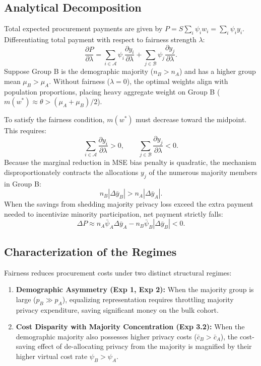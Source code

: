 \documentclass[11pt,a4paper]{article}
\begin{document}
\subsection{Analytical Decomposition}

Total expected procurement payments are given by $P = S \sum_i \psi_i w_i = \sum_i \psi_i y_i$. Differentiating total payment with respect to fairness strength $\lambda$:
\begin{equation}
    \frac{\partial P}{\partial \lambda} = \sum_{i \in \mathcal{A}} \psi_i \frac{\partial y_i}{\partial \lambda} + \sum_{j \in \mathcal{B}} \psi_j \frac{\partial y_j}{\partial \lambda}.
\end{equation}
Suppose Group B is the demographic majority ($n_B > n_A$) and has a higher group mean $\mu_B > \mu_A$. Without fairness ($\lambda = 0$), the optimal weights align with population proportions, placing heavy aggregate weight on Group B ($m(w^*) \approx \theta > (\mu_A+\mu_B)/2$).

To satisfy the fairness condition, $m(w^*)$ must decrease toward the midpoint. This requires:
\begin{equation}
    \sum_{i \in \mathcal{A}} \frac{\partial y_i}{\partial \lambda} > 0, \qquad \sum_{j \in \mathcal{B}} \frac{\partial y_j}{\partial \lambda} < 0.
\end{equation}
Because the marginal reduction in MSE bias penalty is quadratic, the mechanism disproportionately contracts the allocations $y_j$ of the numerous majority members in Group B:
\begin{equation}
    n_B \left| \Delta \bar{y}_B \right| > n_A \left| \Delta \bar{y}_A \right|.
\end{equation}
When the savings from shedding majority privacy loss exceed the extra payment needed to incentivize minority participation, net payment strictly falls:
\begin{equation}
    \Delta P \approx n_A \bar{\psi}_A \Delta \bar{y}_A - n_B \bar{\psi}_B |\Delta \bar{y}_B| < 0.
\end{equation}

\subsection{Characterization of the Regimes}

Fairness reduces procurement costs under two distinct structural regimes:
\begin{enumerate}
    \item \textbf{Demographic Asymmetry (Exp 1, Exp 2):} When the majority group is large ($p_B \gg p_A$), equalizing representation requires throttling majority privacy expenditure, saving significant money on the bulk cohort.
    \item \textbf{Cost Disparity with Majority Concentration (Exp 3.2):} When the demographic majority also possesses higher privacy costs ($\bar{c}_B > \bar{c}_A$), the cost-saving effect of de-allocating privacy from the majority is magnified by their higher virtual cost rate $\psi_B > \psi_A$.
\end{enumerate}
\end{document}
